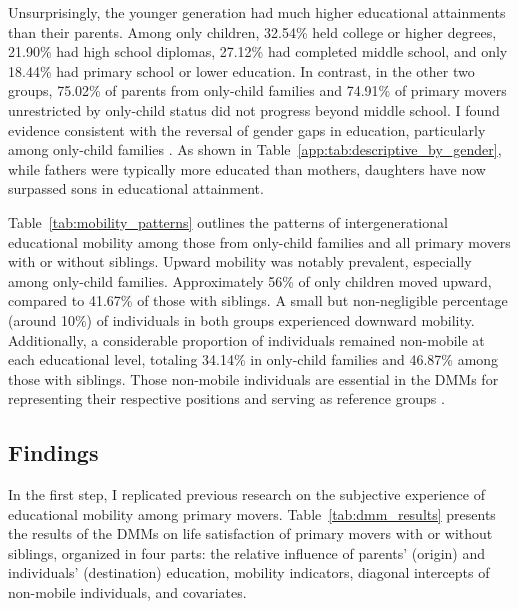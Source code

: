 Unsurprisingly, the younger generation had much higher educational attainments than their parents. Among only children, 32.54\% held college or higher degrees, 21.90\% had high school diplomas, 27.12\% had completed middle school, and only 18.44\% had primary school or lower education. In contrast, in the other two groups, 75.02\% of parents from only-child families and 74.91\% of primary movers unrestricted by only-child status did not progress beyond middle school. I found evidence consistent with the reversal of gender gaps in education, particularly among only-child families \parencite{yeungHigherEducationExpansion2013}. As shown in Table~\ref{app:tab:descriptive_by_gender}, while fathers were typically more educated than mothers, daughters have now surpassed sons in educational attainment.

Table~\ref{tab:mobility_patterns} outlines the patterns of intergenerational educational mobility among those from only-child families and all primary movers with or without siblings. Upward mobility was notably prevalent, especially among only-child families. Approximately 56\% of only children moved upward, compared to 41.67\% of those with siblings. A small but non-negligible percentage (around 10\%) of individuals in both groups experienced downward mobility. Additionally, a considerable proportion of individuals remained non-mobile at each educational level, totaling 34.14\% in only-child families and 46.87\% among those with siblings. Those non-mobile individuals are essential in the DMMs for representing their respective positions and serving as reference groups \parencite{sobelSocialMobilityFertility1985}.

\subsection{Findings}

In the first step, I replicated previous research on the subjective experience of educational mobility among primary movers. Table~\ref{tab:dmm_results} presents the results of the DMMs on life satisfaction of primary movers with or without siblings, organized in four parts: the relative influence of parents' (origin) and individuals' (destination) education, mobility indicators, diagonal intercepts of non-mobile individuals, and covariates.

